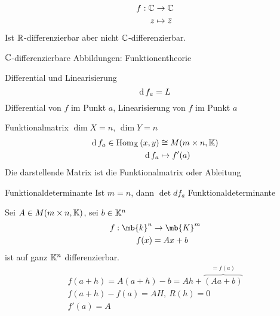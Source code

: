 \begin{Bsp}
  \begin{align*}
    f:\mathbb{C}&\to\mathbb{C}\\
    z&\mapsto \bar z
  \end{align*}
  Ist $\mathbb{R}$-differenzierbar aber nicht $\mathbb{C}$-differenzierbar.
\end{Bsp}
\begin{Bem}
  $\mathbb{C}$-differenzierbare Abbildungen: Funktionentheorie
\end{Bem}
\begin{Not}{Differential und Linearisierung}
  \[\operatorname{d} f_a=L\]
  Differential von $f$ im Punkt $a$, Linearisierung von $f$ im Punkt $a$
\end{Not}
\begin{Not}{Funktionalmatrix}
  $\dim X=n$, $\dim Y=n$
  \begin{align*}
    \operatorname{d} f_a\in \operatorname{Hom}_{\mathbb{K}}\left( x,y \right)&\cong M(m\times n,\mathbb{K})\\
    \operatorname{d} f_a&\mapsto f'(a)
  \end{align*}
  Die darstellende Matrix ist die Funktionalmatrix oder Ableitung
\end{Not}
\begin{Bem}{Funktionaldeterminante}
  Ist $m=n$, dann $\det d f_a$ Funktionaldeterminante
\end{Bem}
\begin{Bsp}
  Sei $A\in M(m\times n, \mathbb{K})$, sei $b\in\mathbb{K}^n$
  \begin{align*}
    f:\mb{k}^n&\to\mb{K}^m\\
    f(x)&=Ax+b
  \end{align*}
  ist auf ganz $\mathbb{K}^n$ differenzierbar.
  \begin{gather*}
    f(a+h)=A(a+h)-b=Ah+\overbrace{(Aa+b)}^{=f(a)}\\
    f(a+h)-f(a)=AH,\ R(h)=0\\
    f'(a)=A
  \end{gather*}
\end{Bsp}
